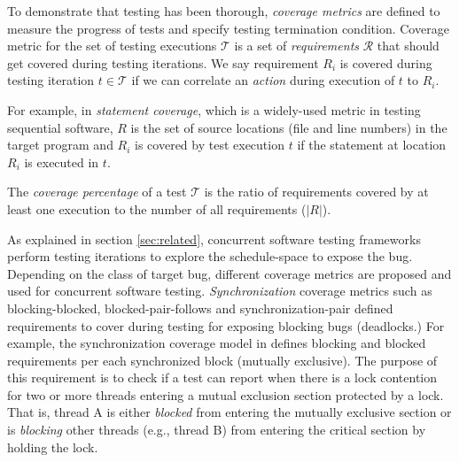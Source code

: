 %
To demonstrate that testing has been thorough, \textit{coverage metrics} are defined to measure the progress of tests and specify testing termination condition.
%
Coverage metric for the set of testing executions $\mathcal{T}$ is a set of \textit{requirements} $\mathcal{R}$ that should get covered during testing iterations.
%
We say requirement $R_i$ is covered during testing iteration $t \in \mathcal{T}$ if we can correlate an \textit{action} during execution of $t$ to $R_i$.

For example, in \textit{statement coverage}, which is a widely-used metric in testing sequential software, $R$ is the set of source locations (file and line numbers) in the target program and $R_i$ is covered by test execution $t$ if the statement at location $R_i$ is executed in $t$.

The \textit{coverage percentage} of a test $\mathcal{T}$ is the ratio of requirements covered by at least one execution to the number of all requirements ($|R|$).

As explained in section \ref{sec:related}, concurrent software testing frameworks perform testing iterations to explore the schedule-space to expose the bug.
%
Depending on the class of target bug, different coverage metrics are proposed and used for concurrent software testing.
%
\textit{Synchronization} coverage metrics such as blocking-blocked\cite{edelstein2003contest}, blocked-pair-follows \cite{trainin-followsCoverage-padtad09} and synchronization-pair \cite{hong-syncTesting-issta12} defined requirements to cover during testing for exposing blocking bugs (\eg deadlocks.)
%
%
For example, the synchronization coverage model in \cite{edelstein2003contest} defines blocking and blocked requirements per each synchronized block (\ie mutually exclusive).
%
The purpose of this requirement is to check if a test can report when there is a lock contention for two or more threads entering a mutual exclusion section protected by a lock.
%
That is, thread A is either \textit{blocked} from entering the mutually exclusive section or is \textit{blocking} other threads (e.g., thread B) from entering the critical section by holding the lock.
%

